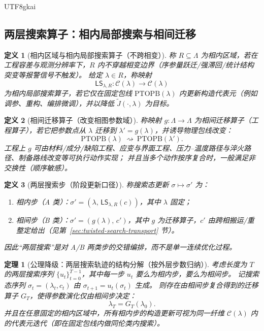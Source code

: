 \documentclass[12pt]{article}
\newtheorem{definition}{定义}[section]
\newtheorem{theorem}{定理}[section]
\newcommand{\PTOPB}{\ensuremath{\mathrm{PTOPB}}}
\begin{document}
\begin{CJK*}{UTF8}{gkai}
\subsection{两层搜索算子：相内局部搜索与相间迁移}
\label{sec:twisted-search-two-level-operators}

\begin{definition}[相内区域与相内局部搜索算子（不跨相变）]
称 $R\subseteq\Lambda$ 为相内区域，若在工程容差与观测分辨率下，$R$ 内不穿越相变边界（序参量跃迁/强滞回/统计结构突变等报警信号不触发）。
给定 $\lambda\in R$，称映射
\[
  \mathsf{LS}_{\lambda,R}:\mathcal{C}(\lambda)\to \mathcal{C}(\lambda)
\]
为相内局部搜索算子，若它仅在固定包线 $\PTOPB(\lambda)$ 内更新构造代表元（例如调参、重构、编排微调），并以降低 $\tilde J(\cdot,\lambda)$ 为目标。
\end{definition}

\begin{definition}[相间迁移算子（改变相图参数域）]
称映射 $g:\Lambda\to\Lambda$ 为相间迁移算子（工程算子），若它把参数点从 $\lambda$ 迁移到 $\lambda' = g(\lambda)$，并诱导物理包线改变：
\[
  \PTOPB(\lambda)\ \rightsquigarrow\ \PTOPB(\lambda').
\]
工程上 $g$ 可由材料/成分/缺陷工程、应变与界面工程、压力--温度路径与淬火路径、制备路线改变等可执行动作实现；
并且当多个动作按序复合时，一般满足非交换性（顺序敏感）。
\end{definition}

\begin{definition}[两层搜索步（阶段更新口径）]
称搜索态更新 $\sigma\mapsto\sigma'$ 为：
\begin{enumerate}
  \item 相内步（A 类）：$\sigma'=(\lambda,\,\mathsf{LS}_{\lambda,R}(c))$，其中 $\lambda$ 固定；
  \item 相间步（B 类）：$\sigma'=(g(\lambda),\,c')$，其中 $g$ 为迁移算子，$c'$ 由跨相搬运/重整定给出（见第~\ref{sec:twisted-search-transport} 节）。
\end{enumerate}
因此“两层搜索”是对 A/B 两类步的交错编排，而不是单一连续优化过程。
\end{definition}

\begin{theorem}[公理降级：两层搜索轨迹的结构分解（按外层步数归纳）]
\label{thm:twisted-two-level-search-decomposition}
考虑长度为 $T$ 的两层搜索序列 $\{u_t\}_{t=0}^{T-1}$，其中每一步 $u_t$ 要么为相内步，要么为相间步。
记搜索态序列 $\sigma_t=(\lambda_t,c_t)$ 由 $\sigma_{t+1}=u_t(\sigma_t)$ 生成。
则存在由相间步复合得到的迁移算子 $G_T$，使得参数演化仅由相间步决定：
\[
  \lambda_T = G_T(\lambda_0).
\]
并且在任意固定的相内区域中，所有相内步的构造更新可视为同一纤维 $\mathcal{C}(\lambda)$ 内的代表元迭代（即在固定包线内做同伦类内搜索）。
\end{theorem}


\end{CJK*}
\end{document}
